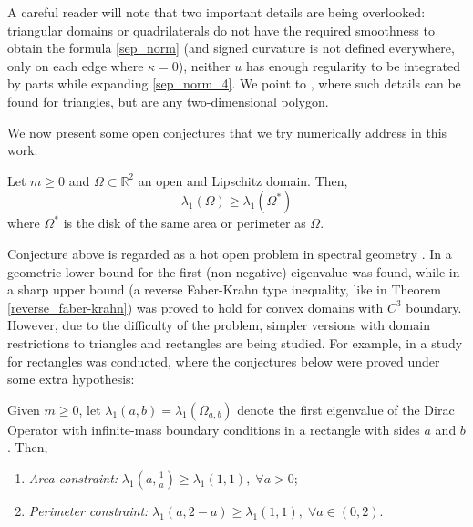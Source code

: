 \begin{remark}
    A careful reader will note that two important details are being overlooked: triangular domains or quadrilaterals do not have the required smoothness to obtain the formula \eqref{sep_norm} (and signed curvature is not defined everywhere, only on each edge where \(\kappa=0\)), neither \(u\) has enough regularity to be integrated by parts while expanding \eqref{sep_norm_4}. We point to \cite{vu2023spectral}, where such details can be found for triangles, but are any two-dimensional polygon.
\end{remark}

We now present some open conjectures that we try numerically address in this work:

\begin{conjecture}
    Let \(m \geq 0\) and \(\Omega \subset \mathbb{R}^2\) an open and Lipschitz domain. Then,
    \[
    \lambda_1(\Omega) \geq \lambda_1(\Omega^\ast)
    \]
    where \(\Omega^\ast\) is the disk of the same area or perimeter as \(\Omega\).
\end{conjecture}
Conjecture above is regarded as a hot open problem in spectral geometry \cite{krejcirik_larson_lotoreichik_2019}. In \cite{benguria2017spectral} a geometric lower bound for the first (non-negative) eigenvalue was found, while in \cite{lotoreichik2019sharp} a sharp upper bound (a reverse Faber-Krahn type inequality, like in Theorem \ref*{reverse_faber-krahn}) was proved to hold for convex domains with \(C^3\) boundary. However, due to the difficulty of the problem, simpler versions with domain restrictions to triangles and rectangles are being studied. For example, in \cite{briet2022spectral} a study for rectangles was conducted, where the conjectures below were proved under some extra hypothesis:
\begin{conjecture}
    Given \(m \geq 0\), let \(\lambda_1(a, b) = \lambda_1(\Omega_{a, b})\) denote the first eigenvalue of the Dirac Operator with infinite-mass boundary conditions in a rectangle with sides \(a\) and \(b\). Then,
    \begin{enumerate}
        \item \textit{Area constraint: } \(\lambda_1(a, \frac{1}{a}) \geq \lambda_1(1, 1), \; \forall a>0 \);
        \item \textit{Perimeter constraint: } \(\lambda_1(a, 2-a) \geq \lambda_1(1, 1), \; \forall a\in (0, 2)\).
    \end{enumerate}
\end{conjecture}
